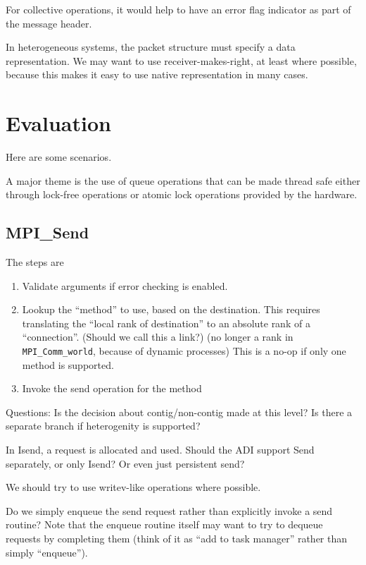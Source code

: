 \documentclass{article}
\let\code=\texttt
\begin{document}
For collective operations, it would help to have an error flag indicator as
part of the message header.

In heterogeneous systems, the packet structure must specify a data
representation.  We may want to use receiver-makes-right, at least where
possible, because this makes it easy to use native representation in many
cases.  

\section{Evaluation}

Here are some scenarios.

A major theme is the use of queue operations that can be made thread safe
either 
through lock-free operations or atomic lock operations provided by the
hardware.  

\subsection{MPI\_Send}
The steps are
\begin{enumerate}
\item Validate arguments if error checking is enabled.
\item Lookup the ``method'' to use, based on the destination.  This requires
  translating the ``local rank of destination'' to an absolute rank of a
  ``connection''. (Should we call this a link?)  (no longer a rank in \code{MPI\_Comm\_world}, because of
  dynamic processes) This is a no-op
  if only one method is supported.
\item Invoke the send operation for the method
\end{enumerate}
Questions: Is the decision about contig/non-contig made at this level?
Is there a separate branch if heterogenity is supported?  

In Isend, a request is allocated and used.  Should the ADI support Send
separately, or only Isend?  Or even just persistent send?

We should try to use writev-like operations where possible.

Do we simply enqueue the send request rather than explicitly invoke a send
routine?  Note that the enqueue routine itself may want to try to dequeue
requests by completing them (think of it as ``add to task manager'' rather
than simply ``enqueue'').
\end{document}

